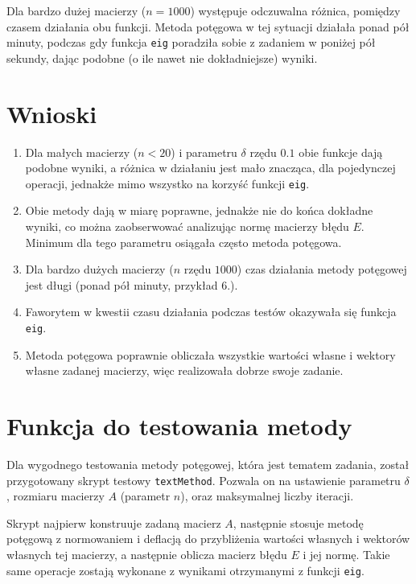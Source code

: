 \documentclass[12pt]{article}
\begin{document}
\begin{enumerate}[label=\textbf{Przykład \arabic*}]
		Dla bardzo dużej macierzy ($n = 1000$) występuje odczuwalna różnica, pomiędzy czasem działania obu funkcji. Metoda potęgowa w tej sytuacji działała ponad pół minuty, podczas gdy funkcja \texttt{eig} poradziła sobie z zadaniem w poniżej pół sekundy, dając podobne (o ile nawet nie dokładniejsze) wyniki.
	\end{enumerate}
	
	
	
	
	\section{Wnioski}
	\begin{enumerate}
		\item Dla małych macierzy ($n < 20$) i parametru $\delta$ rzędu $0.1$ obie funkcje dają podobne wyniki, a różnica w działaniu jest mało znacząca, dla pojedynczej operacji, jednakże mimo wszystko na korzyść funkcji \texttt{eig}.
		
		\item Obie metody dają w miarę poprawne, jednakże nie do końca dokładne wyniki, co można zaobserwować analizując normę macierzy błędu $E$. Minimum dla tego parametru osiągała często metoda potęgowa.
		
		\item Dla bardzo dużych macierzy ($n$ rzędu $1000$) czas działania metody potęgowej jest długi (ponad pół minuty, przykład 6.).
		
		\item Faworytem w kwestii czasu działania podczas testów okazywała się funkcja \texttt{eig}.
		
		\item Metoda potęgowa poprawnie obliczała wszystkie wartości własne i wektory własne zadanej macierzy, więc realizowała dobrze swoje zadanie.
	\end{enumerate}
	
	
	
	\section{Funkcja do testowania metody}
	Dla wygodnego testowania metody potęgowej, która jest tematem zadania, został przygotowany skrypt testowy \texttt{textMethod}. Pozwala on na ustawienie parametru $\delta$, rozmiaru macierzy $A$ (parametr $n$), oraz maksymalnej liczby iteracji.
	
	Skrypt najpierw konstruuje zadaną macierz $A$, następnie stosuje metodę potęgową z normowaniem i deflacją do przybliżenia wartości własnych i wektorów własnych tej macierzy, a następnie oblicza macierz błędu $E$ i jej normę. Takie same operacje zostają wykonane z wynikami otrzymanymi z funkcji \texttt{eig}.
	
\end{document}
